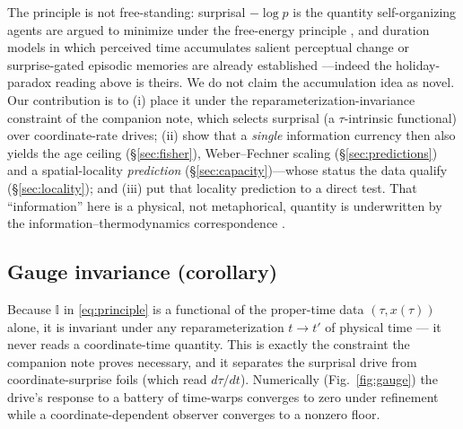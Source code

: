 \documentclass[11pt]{article}
\begin{document}
The principle is not free-standing: surprisal $-\log p$ is the quantity self-organizing
agents are argued to minimize under the free-energy principle \citep{friston2010free}, and
duration models in which perceived time accumulates salient perceptual change or
surprise-gated episodic memories are already established
\citep{roseboom2019activity, fountas2022predictive}---indeed the holiday-paradox reading
above is theirs. We do not claim the accumulation idea as novel. Our contribution is to
(i) place it under the reparameterization-invariance constraint of the companion note, which
selects surprisal (a $\tau$-intrinsic functional) over coordinate-rate drives; (ii) show that
a \emph{single} information currency then also yields the age ceiling (\S\ref{sec:fisher}),
Weber--Fechner scaling (\S\ref{sec:predictions}) and a spatial-locality \emph{prediction}
(\S\ref{sec:capacity})---whose status the data qualify (\S\ref{sec:locality}); and (iii) put
that locality prediction to a direct test. That ``information'' here is a physical, not metaphorical, quantity is
underwritten by the information--thermodynamics correspondence \citep{jaynes1957information,
landauer1961irreversibility}.

\subsection{Gauge invariance (corollary)}
Because $\mathbb{I}$ in \eqref{eq:principle} is a functional of the proper-time data
$(\tau,x(\tau))$ alone, it is invariant under any reparameterization $t\to t'$ of physical
time --- it never reads a coordinate-time quantity. This is exactly the constraint the
companion note proves necessary, and it separates the surprisal drive from
coordinate-surprise foils (which read $d\tau/dt$). Numerically (Fig.~\ref{fig:gauge}) the
drive's response to a battery of time-warps converges to zero under refinement while a
coordinate-dependent observer converges to a nonzero floor.
\end{document}
